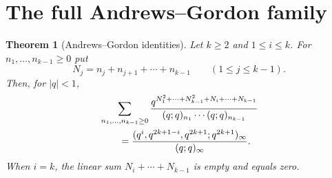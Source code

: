 \documentclass[11pt]{article}
\numberwithin{equation}{section}
\newtheorem{theorem}{Theorem}[section]
\theoremstyle{definition}
\theoremstyle{remark}
\begin{document}
\section{The full Andrews--Gordon family}

\begin{theorem}[Andrews--Gordon identities]\label{thm:AG}
Let $k\ge2$ and $1\le i\le k$.  For
$n_1,\ldots,n_{k-1}\ge0$ put
\[
N_j=n_j+n_{j+1}+\cdots+n_{k-1}\qquad(1\le j\le k-1).
\]
Then, for $|q|<1$,
\begin{align}
&\sum_{n_1,\ldots,n_{k-1}\ge0}
\frac{q^{N_1^2+\cdots+N_{k-1}^2+N_i+\cdots+N_{k-1}}}
{(q;q)_{n_1}\cdots(q;q)_{n_{k-1}}}
\label{eq:AG}\\
&\qquad=
\frac{(q^i,q^{2k+1-i},q^{2k+1};q^{2k+1})_\infty}
{(q;q)_\infty}.
\notag
\end{align}
When $i=k$, the linear sum $N_i+\cdots+N_{k-1}$ is empty and equals zero.
\end{theorem}
\end{document}
